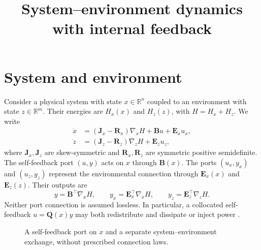 \documentclass[11pt,reqno]{amsart}
\begin{document}
\title{System--environment dynamics with internal feedback}
\maketitle

\section{System and environment}

Consider a physical system with state $x\in\mathbb R^n$ coupled
to an environment with state $z\in\mathbb R^m$. Their energies
are $H_x(x)$ and $H_z(z)$, with $H=H_x+H_z$. We write
\begin{align}
\dot x&=(\mathbf J_x-\mathbf R_x)\nabla_x H
+\mathbf B u+\mathbf E_xu_x, \label{eq:x}\\
\dot z&=(\mathbf J_z-\mathbf R_z)\nabla_z H
+\mathbf E_zu_z, \label{eq:z}
\end{align}
where $\mathbf J_x,\mathbf J_z$ are skew-symmetric and
$\mathbf R_x,\mathbf R_z$ are symmetric positive semidefinite.
The self-feedback port $(u,y)$ acts on $x$ through $\mathbf B(x)$.
The ports $(u_x,y_x)$ and $(u_z,y_z)$ represent the environmental
connection through $\mathbf E_x(x)$ and $\mathbf E_z(z)$.
Their outputs are
\begin{equation}
y=\mathbf B^\top\nabla_x H,\qquad
y_x=\mathbf E_x^\top\nabla_x H,\qquad
y_z=\mathbf E_z^\top\nabla_z H.
\label{eq:outputs}
\end{equation}
Neither port connection is assumed lossless. In particular,
a collocated self-feedback $u=\mathbf Q(x)y$ may both redistribute
and dissipate or inject power \cite{vanderschaft2014}.

\begin{figure}[htb!]
\centering
{}
\caption{A self-feedback port on $x$ and a separate
system--environment exchange, without prescribed connection laws.}
\label{fig:scheme}
\end{figure}
\end{document}
